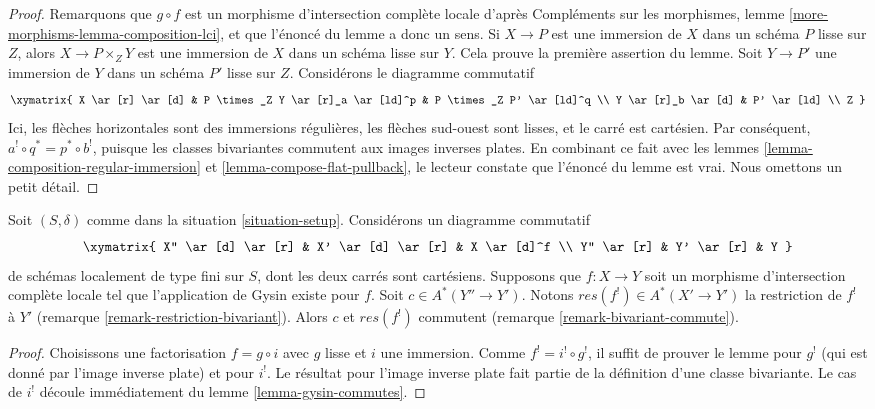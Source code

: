 \begin{proof}
Remarquons que $g \circ f$ est un morphisme d'intersection complète locale
d'après Compléments sur les morphismes, lemme \ref{more-morphisms-lemma-composition-lci},
et que l'énoncé du lemme a donc un sens.
Si $X \to P$ est une immersion de $X$ dans un schéma $P$ lisse sur $Z$,
alors $X \to P \times_Z Y$ est une immersion de $X$ dans un schéma lisse
sur $Y$. Cela prouve la première assertion du lemme.
Soit $Y \to P'$ une immersion de $Y$ dans un schéma $P'$ lisse sur $Z$.
Considérons le diagramme commutatif
$$
\xymatrix{
X \ar[r] \ar[d] &
P \times_Z Y \ar[r]_a \ar[ld]^p &
P \times_Z P' \ar[ld]^q \\
Y \ar[r]_b \ar[d] &
P' \ar[ld] \\
Z
}
$$
Ici, les flèches horizontales sont des immersions régulières, les flèches sud-ouest
sont lisses, et le carré est cartésien. Par conséquent,
$a^! \circ q^* = p^* \circ b^!$, puisque les classes bivariantes commutent
aux images inverses plates. En combinant ce fait avec les
lemmes \ref{lemma-composition-regular-immersion} et
\ref{lemma-compose-flat-pullback},
le lecteur constate que l'énoncé du lemme est vrai.
Nous omettons un petit détail.
\end{proof}

\begin{lemma}
\label{lemma-lci-gysin-commutes}
Soit $(S, \delta)$ comme dans la situation \ref{situation-setup}.
Considérons un diagramme commutatif
$$
\xymatrix{
X'' \ar[d] \ar[r] &
X' \ar[d] \ar[r] &
X \ar[d]^f \\
Y'' \ar[r] &
Y' \ar[r] &
Y
}
$$
de schémas localement de type fini sur $S$, dont les deux carrés sont cartésiens.
Supposons que $f : X \to Y$ soit un morphisme d'intersection complète locale
tel que l'application de Gysin existe pour $f$. Soit $c \in A^*(Y'' \to Y')$. Notons
$res(f^!) \in A^*(X' \to Y')$ la restriction de $f^!$ à $Y'$
(remarque \ref{remark-restriction-bivariant}). Alors $c$ et $res(f^!)$ commutent
(remarque \ref{remark-bivariant-commute}).
\end{lemma}

\begin{proof}
Choisissons une factorisation $f = g \circ i$ avec $g$ lisse et $i$ une immersion.
Comme $f^! = i^! \circ g^!$, il suffit de prouver le lemme pour $g^!$
(qui est donné par l'image inverse plate) et pour $i^!$. Le résultat pour l'image inverse plate
fait partie de la définition d'une classe bivariante. Le cas de $i^!$ découle
immédiatement du lemme \ref{lemma-gysin-commutes}.
\end{proof}

